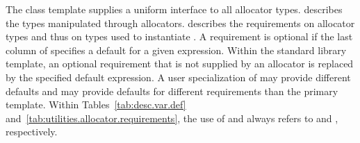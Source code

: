 \pnum
The class template  supplies
a uniform interface to all allocator types.
 describes the types manipulated
through allocators. 
describes the requirements on allocator types
and thus on types used to instantiate . A requirement
is optional if the last column of
 specifies a default for a
given expression. Within the standard library 
template, an optional requirement that is not supplied by an allocator is
replaced by the specified default expression. A user specialization of
 may provide different defaults and may provide
defaults for different requirements than the primary template. Within
Tables~\ref{tab:desc.var.def} and~\ref{tab:utilities.allocator.requirements},
the use of  and  always refers to 
and , respectively.

